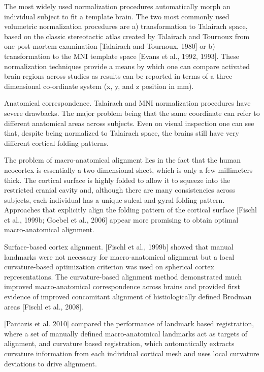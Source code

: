 The most widely used normalization procedures automatically morph an individual
subject to fit a template brain.
%
The two most commonly used volumetric normalization procedures are
%
a) transformation to Talairach space, based on the classic stereotactic atlas
created by Talairach and Tournoux from one post-mortem examination [Talairach
and Tournoux, 1980] or
%
b) transformation to the MNI template space [Evans et al., 1992, 1993].
%
These normalization techniques provide a means by which one can compare
activated brain regions across studies as results can be reported in terms of a
three dimensional co-ordinate system (x, y, and z position in mm).

Anatomical correspondence.
%
Talairach and MNI normalization procedures have severe drawbacks.
%
The major problem being that the same coordinate can refer to different
anatomical areas across subjects.
%
Even on visual inspection one can see that, despite being normalized to
Talairach space, the brains still have very different cortical folding patterns.

%
The problem of macro-anatomical alignment lies in the fact that the human
neocortex is essentially a two dimensional sheet, which is only a few
millimeters thick.
%
The cortical surface is highly folded to allow it to squeeze into the restricted
cranial cavity and, although there are many consistencies across subjects, each
individual has a unique sulcal and gyral folding pattern.
%
Approaches that explicitly align the folding pattern of the cortical surface
[Fischl et al., 1999b; Goebel et al., 2006] appear more promising to obtain
optimal macro-anatomical alignment.


Surface-based cortex alignment.
%
[Fischl et al., 1999b] showed that manual landmarks were not necessary for
macro-anatomical alignment but a local curvature-based optimization criterion
was used on spherical cortex representations.
%
The curvature-based alignment method demonstrated much improved macro-anatomical
correspondence across brains and provided first evidence of improved concomitant
alignment of histiologically defined Brodman areas [Fischl et al., 2008].

%
[Pantazis et al. 2010] compared the performance of landmark based registration,
where a set of manually defined macro-anatomical landmarks act as targets of
alignment, and curvature based registration, which automatically extracts
curvature information from each individual cortical mesh and uses local
curvature deviations to drive alignment.

